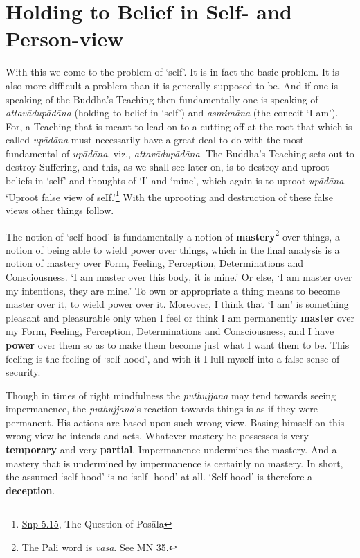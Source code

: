 \chapter{Holding to Belief in Self- and Person-view}

With this we come to the problem of `self'. It is in fact the basic problem. It is also more difficult a problem than it is generally supposed to be. And if one is speaking of the Buddha's Teaching then fundamentally one is speaking of \emph{attavādupādāna} (holding to belief in `self') and \emph{asmimāna} (the conceit `I am'). For, a Teaching that is meant to lead on to a cutting off at the root that which is called \emph{upādāna} must necessarily have a great deal to do with the most fundamental of \emph{upādāna}, viz., \emph{attavādupādāna}. The Buddha's Teaching sets out to destroy Suffering, and this, as we shall see later on, is to destroy and uproot beliefs in `self' and thoughts of `I' and `mine', which again is to uproot \emph{upādāna}. `Uproot false view of seIf.'\footnote{\href{https://suttacentral.net/snp5.15/en/sujato}{Snp 5.15}, The Question of Posāla} With the uprooting and destruction of these false views other things follow.

The notion of `self-hood' is fundamentally a notion of \textbf{mastery}\footnote{The Pali word is \emph{vasa}. See \href{https://suttacentral.net/mn35/en/sujato}{MN 35}.} over things, a notion of being able to wield power over things, which in the final analysis is a notion of mastery over Form, Feeling, Perception, Determinations and Consciousness. `I am master over this body, it is mine.' Or else, `I am master over my intentions, they are mine.' To own or appropriate a thing means to become master over it, to wield power over it. Moreover, I think that `I am' is something pleasant and pleasurable only when I feel or think I am permanently \textbf{master} over my Form, Feeling, Perception, Determinations and Consciousness, and I have \textbf{power} over them so as to make them become just what I want them to be. This feeling is the feeling of `self-hood', and with it I lull myself into a false sense of security.

Though in times of right mindfulness the \emph{puthujjana} may tend towards seeing impermanence, the \emph{puthujjana}'s reaction towards things is as if they were permanent. His actions are based upon such wrong view. Basing himself on this wrong view he intends and acts. Whatever mastery he possesses is very \textbf{temporary} and very \textbf{partial}. Impermanence undermines the mastery. And a mastery that is undermined by impermanence is certainly no mastery. In short, the assumed `self-hood' is no `self- hood' at all. `Self-hood' is therefore a \textbf{deception}.

